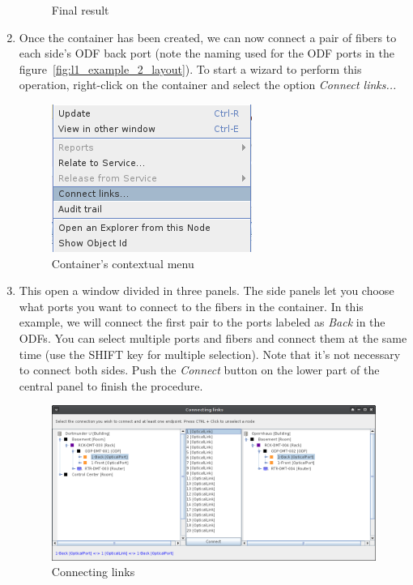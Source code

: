 \documentclass[a4paper]{article}
\begin{document}
\begin{enumerate}
\begin{figure}[h!]
						\caption{Final result}
						\label{fig:l1_example_2_final}
					\end{figure}
					\item Once the container has been created, we can now connect a pair of fibers to each side's ODF back port (note the naming used for the ODF ports in the figure~\ref{fig:l1_example_2_layout}). To start a wizard to perform this operation, right-click on the container and select the option \textit{Connect links...}
					\begin{figure}[h!]
						\centering
						\includegraphics[width=0.3\linewidth]{img/l1_example_2_container_context_menu.png}
						\caption{Container's contextual menu}
						\label{fig:l1_example_2_container_context_menu}
					\end{figure}
					\item This open a window divided in three panels. The side panels let you choose what ports you want to connect to the fibers in the container. In this example, we will connect the first pair to the ports labeled as \textit{Back} in the ODFs. You can select multiple ports and fibers and connect them at the same time (use the SHIFT key for multiple selection). Note that it's not necessary to connect both sides. Push the \textit{Connect} button on the lower part of the central panel to finish the procedure.
					\begin{figure}[h!]
						\centering
						\includegraphics[width=\linewidth]{img/l1_example_2_connect_links.png}
						\caption{Connecting links}
						\label{fig:l1_example_2_connect_links}
					\end{figure}

\end{enumerate}
\end{document}

